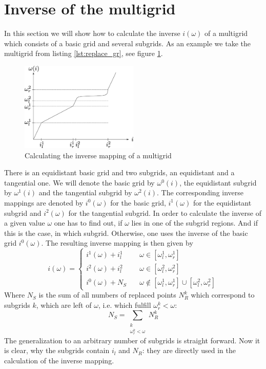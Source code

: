 \section{Inverse of the multigrid}\label{sec:inverse_of_the_multigrid}
In this section we will show how to calculate the inverse $i(\omega)$ of a multigrid which consists of a basic grid and several subgrids. As an example we take the multigrid from listing \ref{lst:replace_gr}, see figure \ref{fig:inverse}.

\begin{figure}[h]
	\centering
	\includegraphics[width=0.5\textwidth]{pics/inverse.eps}
	\caption{Calculating the inverse mapping of a multigrid}
	\label{fig:inverse}
\end{figure}

There is an equidistant basic grid and two subgrids, an equidistant and a tangential one. We will denote the basic grid by $\omega^0(i)$, the equidistant subgrid by $\omega^1(i)$ and the tangential subgrid by $\omega^2(i)$. The corresponding inverse mappings are denoted by $i^0(\omega)$ for the basic grid, $i^1(\omega)$ for the equidistant subgrid and $i^2(\omega)$ for the tangential subgrid. In order to calculate the inverse of a given value $\omega$ one has to find out, if $\omega$ lies in one of the subgrid regions. And if this is the case, in which subgrid. Otherwise, one uses the inverse of the basic grid $i^0(\omega)$. The resulting inverse mapping is then given by
\begin{equation}\label{eqn:inverse}
	i(\omega)=\begin{cases}
			i^1(\omega) + i_l^1 \quad & \omega \in [\omega_l^1, \omega_r^1]\\
			i^2(\omega) + i_l^2 \quad & \omega \in [\omega_l^2, \omega_r^2]\\
			i^0(\omega) + N_S \quad & \omega \notin [\omega_l^1, \omega_r^1] \cup [\omega_l^2, \omega_r^2]
	          \end{cases}
\end{equation}
Where $N_S$ is the sum of all numbers of replaced points $N_R^k$ which correspond to subgrids $k$, which are left of $\omega$, i.e. which fulfill $\omega_r^k<\omega$:
\[
	N_S=\sum_{\substack{k\\ \omega_r^k<\omega}} N_R^k
\]
The generalization to an arbitrary number of subgrids is straight forward. Now it is clear, why the subgrids contain $i_l$ and $N_R$: they are directly used in the calculation of the inverse mapping.

